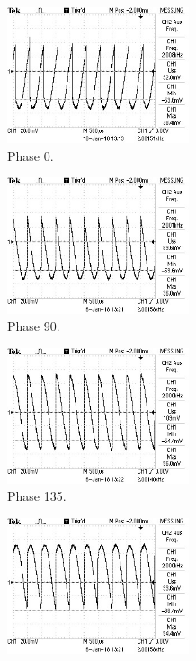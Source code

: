 \begin{figure}
  \centering
  \begin{subfigure}{0.48\textwidth}
    \centering
    \includegraphics[height=4cm]{phase0.jpg}
    \caption{Phase 0.}
    \label{fig:phase0}
  \end{subfigure}
  \begin{subfigure}{0.48\textwidth}
    \centering
    \includegraphics[height=4cm]{phase90.jpg}
    \caption{Phase 90.}
    \label{fig:phase90}
  \end{subfigure}
  \begin{subfigure}{0.48\textwidth}
    \centering
    \includegraphics[height=4cm]{phase135.jpg}
    \caption{Phase 135.}
    \label{fig:phase135}
  \end{subfigure}
  \begin{subfigure}{0.48\textwidth}
    \centering
    \includegraphics[height=4cm]{phase180.jpg}

\end{subfigure}
\end{figure}
